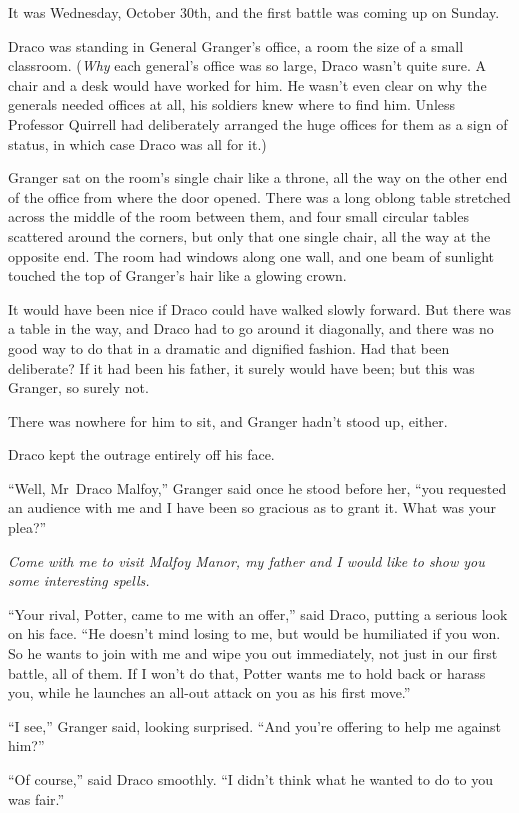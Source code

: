 It was Wednesday, October 30th, and the first battle was coming up on Sunday.

Draco was standing in General Granger’s office, a room the size of a small classroom. (\emph{Why} each general’s office was so large, Draco wasn’t quite sure. A chair and a desk would have worked for him. He wasn’t even clear on why the generals needed offices at all, his soldiers knew where to find him. Unless Professor Quirrell had deliberately arranged the huge offices for them as a sign of status, in which case Draco was all for it.)

Granger sat on the room’s single chair like a throne, all the way on the other end of the office from where the door opened. There was a long oblong table stretched across the middle of the room between them, and four small circular tables scattered around the corners, but only that one single chair, all the way at the opposite end. The room had windows along one wall, and one beam of sunlight touched the top of Granger’s hair like a glowing crown.

It would have been nice if Draco could have walked slowly forward. But there was a table in the way, and Draco had to go around it diagonally, and there was no good way to do that in a dramatic and dignified fashion. Had that been deliberate? If it had been his father, it surely would have been; but this was Granger, so surely not.

There was nowhere for him to sit, and Granger hadn’t stood up, either.

Draco kept the outrage entirely off his face.

“Well, Mr~Draco Malfoy,” Granger said once he stood before her, “you requested an audience with me and I have been so gracious as to grant it. What was your plea?”

\emph{Come with me to visit Malfoy Manor, my father and I would like to show you some interesting spells.}

“Your rival, Potter, came to me with an offer,” said Draco, putting a serious look on his face. “He doesn’t mind losing to me, but would be humiliated if you won. So he wants to join with me and wipe you out immediately, not just in our first battle, all of them. If I won’t do that, Potter wants me to hold back or harass you, while he launches an all-out attack on you as his first move.”

“I see,” Granger said, looking surprised. “And you’re offering to help me against him?”

“Of course,” said Draco smoothly. “I didn’t think what he wanted to do to you was fair.”

